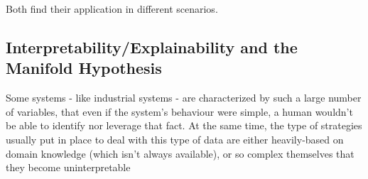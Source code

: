 \documentclass{article}
\begin{document}
Both find their application in different scenarios.

\subsection{Interpretability/Explainability and the Manifold Hypothesis}
Some systems - like industrial systems - are characterized by such a large
number of variables, that even if the system's behaviour were simple, a human
wouldn't be able to identify nor leverage that fact. At the same time, the
type of strategies usually put in place to deal with this type of data are
either heavily-based on domain knowledge (which isn't always available), or
so complex themselves that they become uninterpretable





\end{document}
